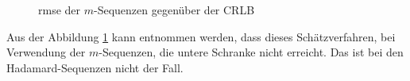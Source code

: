 \begin{figure}[htbp]
	\centering
	\caption{\gls{rmse} der $m$-Sequenzen gegenüber der \gls{CRLB}}
	\label{fig:m_Phasendifferenz_CRLB_vergleich}
\end{figure}

Aus der Abbildung \ref{fig:m_Phasendifferenz_CRLB_vergleich} kann entnommen werden, dass dieses Schätzverfahren, bei Verwendung der $m$-Sequenzen, die untere Schranke nicht erreicht. Das ist bei den Hadamard-Sequenzen nicht der Fall.

